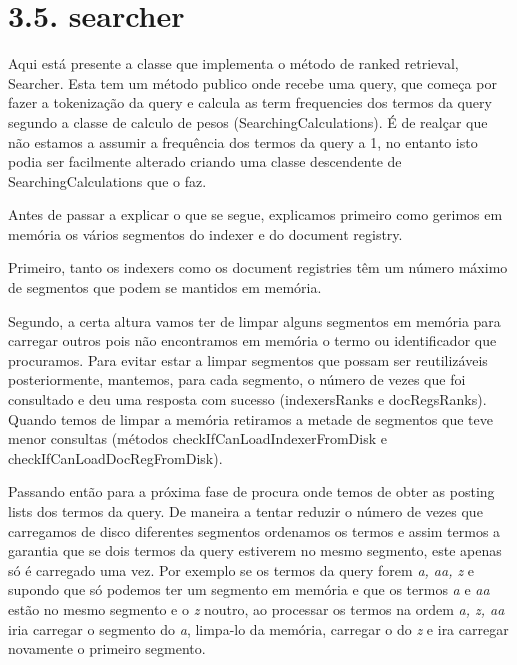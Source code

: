 \documentclass[12pt]{article}
\begin{document}
\section*{3.5. searcher}

Aqui está presente a classe que implementa o método de ranked
retrieval, Searcher.
Esta tem um método publico onde recebe uma query, que começa por
fazer a tokenização da query e calcula as term frequencies dos termos
da query segundo a classe de calculo de pesos
(SearchingCalculations).
É de realçar que não estamos a assumir a frequência dos termos da
query a 1, no entanto isto podia ser facilmente alterado criando uma
classe descendente de SearchingCalculations que o faz.

Antes de passar a explicar o que se segue, explicamos primeiro como
gerimos em memória os vários segmentos do indexer e do document
registry.

Primeiro, tanto os indexers como os document registries têm um número
máximo de segmentos que podem se mantidos em memória.

Segundo, a certa altura vamos ter de limpar alguns segmentos em
memória para carregar outros pois não encontramos em memória o termo
ou identificador que procuramos.
Para evitar estar a limpar segmentos que possam ser reutilizáveis
posteriormente, mantemos, para cada segmento, o número de vezes que
foi consultado e deu uma resposta com sucesso (indexersRanks e
docRegsRanks).
Quando temos de limpar a memória retiramos a metade de segmentos que
teve menor consultas (métodos checkIfCanLoadIndexerFromDisk e
checkIfCanLoadDocRegFromDisk).

Passando então para a próxima fase de procura onde temos de obter as
posting lists dos termos da query.
De maneira a tentar reduzir o número de vezes que carregamos de disco
diferentes segmentos ordenamos os termos e assim termos a garantia
que se dois termos da query estiverem no mesmo segmento, este apenas
só é carregado uma vez.
Por exemplo se os termos da query forem {\it a, aa, z} e supondo que
só podemos ter um segmento em memória e que os termos {\it a} e {\it
aa} estão no mesmo segmento e o {\it z} noutro, ao processar os
termos na ordem {\it a, z, aa} iria carregar o segmento do {\it a},
limpa-lo da memória, carregar o do {\it z} e ira carregar novamente o
primeiro segmento.
\end{document}
